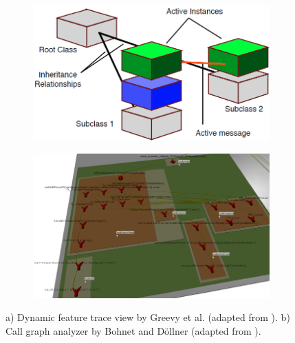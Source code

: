 \begin{figure}[tb]
	\centering
	
	\begin{subfigure}[b]{0.45\textwidth}
		\centering
        \includegraphics[width=\textwidth]{../images/06-Greevy-3D}
        \caption[Dynamic Feature Trace view by Greevy et al.]{}
		\label{fig:3DGreevy}
	\end{subfigure}
	\quad
	\begin{subfigure}[b]{0.45\textwidth}
		\centering
		\includegraphics[width=\textwidth]{../images/06-Bohnet-3D}
		\caption[Call Graph Analyzer by Bohnet and Döllner]{}
		\label{fig:3DBohnet}
	\end{subfigure}
	
	\caption[TOC Caption]{
		a) Dynamic feature trace view by Greevy et al. (adapted from \cite{greevy_visualizing_2006}).
		b) Call graph analyzer by Bohnet and Döllner (adapted from \cite{bohnet_visual_2006}).
	}
\end{figure}


